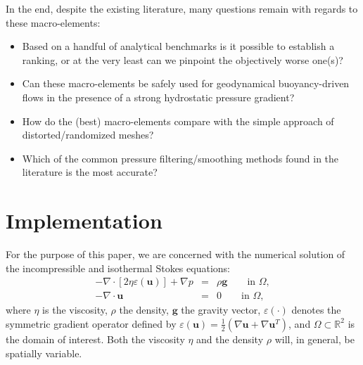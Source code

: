 \documentclass[a4paper,12pt]{article}
\begin{document}
\vspace{.4cm}


In the end, despite the existing literature, many questions remain with regards to these macro-elements:
\begin{itemize}
\item Based on a handful of analytical benchmarks is it possible to establish a ranking, 
or at the very least can we pinpoint the objectively worse one(s)?


\item Can these macro-elements be safely used for geodynamical 
buoyancy-driven flows in the presence of a strong hydrostatic pressure gradient?

\item How do the (best) macro-elements compare with the simple approach of 
distorted/randomized meshes?

\item Which of the common pressure filtering/smoothing methods found in the literature is the most accurate?
\end{itemize}











\section{Implementation}


For the purpose of this paper, we are concerned with the numerical solution of 
the incompressible and isothermal Stokes equations:
\begin{eqnarray}
-\nabla \cdot \left[ 2\eta \varepsilon({\bm u}) \right] + \nabla p &=& \rho \bm g \qquad  \textrm{in $\Omega$},
\label{eq:conv_momentum}  \\  
-\nabla \cdot {\bm u} &=& 0    \qquad    \textrm{in $\Omega$},   \label{eq:conv_mass} 
\end{eqnarray}
where $\eta$ is the viscosity, $\rho$ the density, ${\bm g}$ the gravity vector, $\varepsilon(\cdot)$
denotes the symmetric gradient operator defined by $\varepsilon({\bm u})
=\frac 12 (\nabla {\bm u} + \nabla {\bm u}^{T})$, 
and $\Omega\subset{\mathbb R}^2$ is the domain
of interest. Both the viscosity $\eta$
and the density $\rho$ will, in general, be spatially variable.
\end{document}
